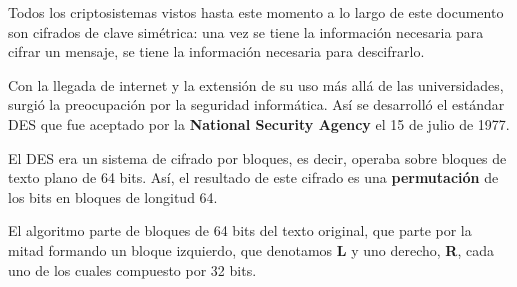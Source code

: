 \documentclass[nochap]{apuntesURJC}
\begin{document}
Todos los criptosistemas vistos hasta este momento a lo largo de este documento son cifrados de clave simétrica: una vez se tiene la información necesaria para cifrar un mensaje, se tiene la información necesaria para descifrarlo.

Con la llegada de internet y la extensión de su uso más allá de las universidades, surgió la preocupación por la seguridad informática. Así se desarrolló el estándar DES que fue aceptado por la \textbf{National Security Agency} el 15 de julio de 1977.

El DES era un sistema de cifrado por bloques, es decir, operaba sobre bloques de texto plano de 64 bits. Así, el resultado de este cifrado es una \textbf{permutación} de los bits en bloques de longitud 64.

El algoritmo parte de bloques de 64 bits del texto original, que parte por la mitad formando un bloque izquierdo, que denotamos \textbf{L} y uno derecho, \textbf{R}, cada uno de los cuales compuesto por 32 bits.
\end{document}
